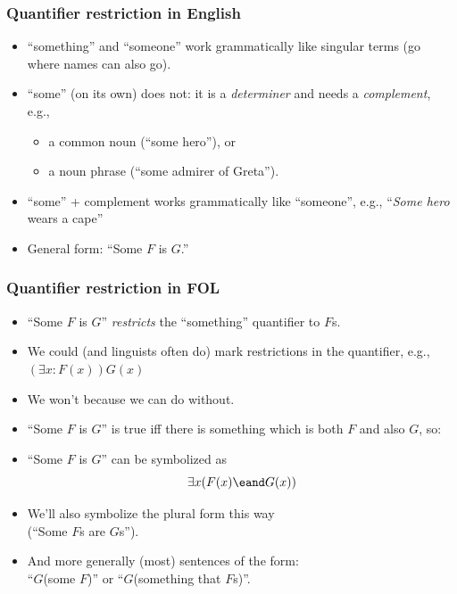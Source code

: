 \begin{frame}
\frametitle{Quantifier restriction in English}

\begin{itemize}[<+->]
  \item ``something'' and ``someone'' work grammatically like singular
  terms (go where names can also go).
  \item ``some'' (on its own) does not: it is a \emph{determiner} and
  needs a \emph{complement}, e.g.,
  \begin{itemize}
    \item a common noun (``some hero''), or
    \item a noun phrase (``some admirer of Greta'').
  \end{itemize}
  \item ``some'' + complement works grammatically like ``someone'',
  e.g., ``\emph{Some hero} wears a cape''
  \item General form: ``Some $F$ is $G$.''
\end{itemize}
\end{frame}

\begin{frame}
\frametitle{Quantifier restriction in FOL}

\begin{itemize}[<+->]
  \item ``Some $F$ is $G$'' \emph{restricts} the ``something''
  quantifier to $F$s.
  \item We could (and linguists often do) mark restrictions in the
  quantifier, e.g., $(\exists x\colon F(x)) G(x)$
  \item We won't because we can do without.
  \item ``Some $F$ is $G$'' is true iff there is something which
  is both $F$ and also $G$, so:
  \item ``Some $F$ is $G$'' can be symbolized as
  \[ \exists x(F(x) \eand G(x)) \]
  \item We'll also symbolize the plural form this way\\ (``Some $F$s are
  $G$s'').
  \item And more generally (most) sentences of the form:\\
  ``$G$(some $F$)'' or ``$G$(something that $F$s)''.
\end{itemize}
\end{frame}

